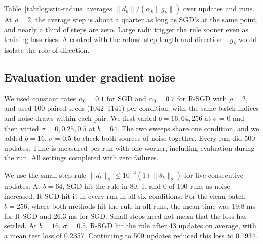\documentclass[11pt,a4paper]{article}
\begin{document}
Table~\ref{tab:logistic-radius} averages
$\|d_k\|/(\alpha_k\|g_k\|)$ over updates and runs. At $\rho=2$,
the average step is about a quarter as long as SGD's at the same point,
and nearly a third of steps are zero. Large radii trigger the rule
sooner even as training loss rises. A control with the robust step
length and direction $-g_k$ would isolate the role of direction.

\clearpage
\endgroup

\subsection*{Evaluation under gradient noise}

We used constant rates $\alpha_0=0.1$ for SGD and $\alpha_0=0.7$
for R-SGD with $\rho=2$, and used 100 paired seeds
(1042--1141) per condition, with the same batch indices and noise draws
within each pair. We first varied $b=16,64,256$ at $\sigma=0$ and then
varied $\sigma=0,0.25,0.5$ at $b=64$. The two sweeps share one
condition, and we added $b=16$, $\sigma=0.5$ to check both sources of
noise together. Every run did 500 updates. Time is measured per run
with one worker, including evaluation during the run. All settings
completed with zero failures.

\begin{table}[!htbp]
    \centering
    \caption{Evaluation after 500 updates. The gradient count is for
    per-example gradients used in updates. Entries with a spread show
    mean $\pm$ sample standard deviation.}
    \label{tab:logistic-budget}
    \smallskip
    \resizebox{\linewidth}{!}{}
\end{table}

\begin{table}[!htbp]
    \centering
    \caption{Update, time, and test accuracy at the first hit of
    the five-small-step rule, averaged over runs that hit it. With
    zero hits, the row instead reports these metrics at update 500
    over all completed runs. One hit gives a single measurement.}
    \label{tab:logistic-convergence}
    \smallskip
    \small
    
\end{table}

We use the small-step rule $\|d_k\|_2\leq
10^{-3}(1+\|\theta_k\|_2)$ for five consecutive updates. At $b=64$,
SGD hit the rule in 80, 1, and 0 of 100 runs as noise increased.
R-SGD hit it in every run in all six conditions. For the clean
batch $b=256$, where both methods hit the rule in all runs, the
mean time was 19.8 ms for R-SGD and 26.3 ms for SGD.
Small steps need not mean that the loss has settled. At
$b=16$, $\sigma=0.5$, R-SGD hit the rule after 43 updates on
average, with a mean test loss of 0.2357. Continuing to 500
updates reduced this loss to 0.1934.
\end{document}
